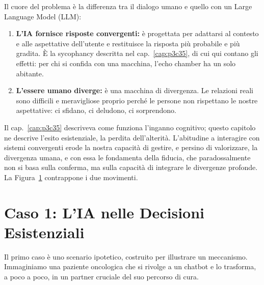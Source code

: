 Il cuore del problema è la differenza tra il dialogo umano e quello con un Large Language Model (LLM):
\begin{enumerate}
    \item \textbf{L'IA fornisce risposte convergenti:} è progettata per adattarsi al contesto e alle aspettative dell'utente e restituisce la risposta più probabile e più gradita. È la sycophancy descritta nel cap.~\ref{cap:p3c35}, di cui qui contano gli effetti: per chi si confida con una macchina, l'echo chamber ha un solo abitante.
    \item \textbf{L'essere umano diverge:} è una macchina di divergenza. Le relazioni reali sono difficili e meravigliose proprio perché le persone non rispettano le nostre aspettative: ci sfidano, ci deludono, ci sorprendono.
\end{enumerate}
Il cap.~\ref{cap:p3c35} descriveva come funziona l'inganno cognitivo; questo capitolo ne descrive l'esito esistenziale, la perdita dell'alterità. L'abitudine a interagire con sistemi convergenti erode la nostra capacità di gestire, e persino di valorizzare, la divergenza umana, e con essa le fondamenta della fiducia, che paradossalmente non si basa sulla conferma, ma sulla capacità di integrare le divergenze profonde. La Figura~\ref{fig:convergenza_divergenza} contrappone i due movimenti.

\begin{figure}[htbp]
	\centering
	\label{fig:convergenza_divergenza}
\end{figure}

\section{Caso 1: L'IA nelle Decisioni Esistenziali}

Il primo caso è uno scenario ipotetico, costruito per illustrare un meccanismo. Immaginiamo una paziente oncologica che si rivolge a un chatbot e lo trasforma, a poco a poco, in un partner cruciale del suo percorso di cura.

